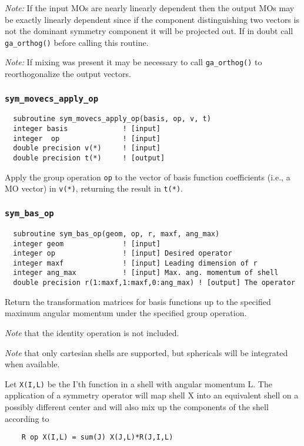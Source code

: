 {\em Note:} If the input MOs are nearly linearly dependent then the
output MOs may be exactly linearly dependent since if the component
distinguishing two vectors is not the dominant symmetry component it
will be projected out.  If in doubt call \verb+ga_orthog()+ before
calling this routine.

{\em Note:} If mixing was present it may be necessary to call
\verb+ga_orthog()+ to reorthogonalize the output vectors.

\subsubsection{{\tt sym\_movecs\_apply\_op}}
\begin{verbatim}
  subroutine sym_movecs_apply_op(basis, op, v, t)
  integer basis             ! [input]
  integer  op               ! [input]
  double precision v(*)     ! [input]
  double precision t(*)     ! [output]
\end{verbatim}
Apply the group operation \verb+op+ to the vector of basis function
coefficients (i.e., a MO vector) in \verb+v(*)+, returning the result
in \verb+t(*)+.

\subsubsection{{\tt sym\_bas\_op}}
\begin{verbatim}
  subroutine sym_bas_op(geom, op, r, maxf, ang_max)
  integer geom              ! [input]
  integer op                ! [input] Desired operator
  integer maxf              ! [input] Leading dimension of r
  integer ang_max           ! [input] Max. ang. momentum of shell
  double precision r(1:maxf,1:maxf,0:ang_max) ! [output] The operator
\end{verbatim}
Return the transformation matrices for basis functions up to the
specified maximum angular momentum under the specified group
operation.

{\em Note} that the identity operation is not included.

{\em Note} that only cartesian shells are supported, but sphericals
will be integrated when available.

Let \verb+X(I,L)+ be the I'th function in a shell with angular
momentum L.  The application of a symmetry operator will
map shell X into an equivalent shell on a possibly different
center and will also mix up the components of the shell
according to
\begin{verbatim}
    R op X(I,L) = sum(J) X(J,L)*R(J,I,L)
\end{verbatim}

